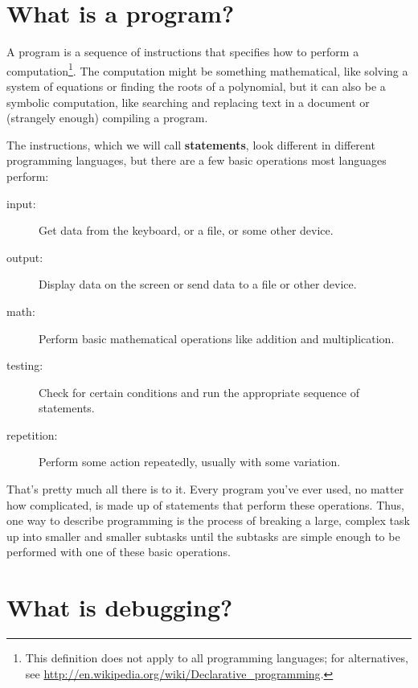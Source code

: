 \documentclass[12pt]{book}
\theoremstyle{definition}
\begin{document}
\section{What is a program?}

A program is a sequence of instructions that specifies how to perform
a computation\footnote{This definition does not apply to all
  programming languages; for alternatives, see
  \url{http://en.wikipedia.org/wiki/Declarative_programming}.}.  The
computation might be something mathematical, like solving a system of
equations or finding the roots of a polynomial, but it can also be a
symbolic computation, like searching and replacing text in a document
or (strangely enough) compiling a program.


The instructions, which we will call {\bf statements}, look different
in different programming languages, but there are a few basic
operations most languages perform:

\begin{description}

\item[input:] Get data from the keyboard, or a file, or some
other device.

\item[output:] Display data on the screen or send data to a
file or other device.

\item[math:] Perform basic mathematical operations like addition and
multiplication.

\item[testing:] Check for certain conditions and run the
appropriate sequence of statements.

\item[repetition:] Perform some action repeatedly, usually with
some variation.

\end{description}

That's pretty much all there is to it.
Every program you've ever used, no matter how complicated, is
made up of statements that perform these operations.  Thus,
one way to describe programming is the process of breaking a
large, complex task up into smaller and smaller subtasks
until the subtasks are simple enough to be performed
with one of these basic operations.


\section{What is debugging?}
\end{document}
